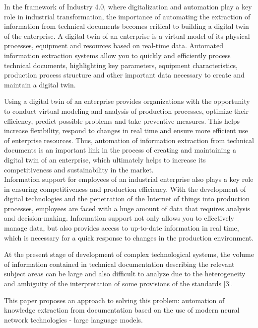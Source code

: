 \documentclass [11pt,a4paper]{article}
\begin{document}
\begin{multicols}{2}
\fontsize{11}{12}\selectfont \vspace{0.5cm} 
 \par   In the framework of Industry 4.0, where digitalization
and automation play a key role in industrial transformation, the importance of automating the extraction of
information from technical documents becomes critical
to building a digital twin of the enterprise. A digital twin
of an enterprise is a virtual model of its physical processes, equipment and resources based on real-time data.
Automated information extraction systems allow you
to quickly and efficiently process technical documents,
highlighting key parameters, equipment characteristics,
production process structure and other important data
necessary to create and maintain a digital twin.\setlength{\parskip}{0.1cm}
\par
Using a digital twin of an enterprise provides organizations with the opportunity to conduct virtual modeling
and analysis of production processes, optimize their
efficiency, predict possible problems and take preventive measures. This helps increase flexibility, respond
to changes in real time and ensure more efficient use
of enterprise resources. Thus, automation of information
extraction from technical documents is an important link
in the process of creating and maintaining a digital twin
of an enterprise, which ultimately helps to increase its
competitiveness and sustainability in the market.\\Information support for employees of an industrial
enterprise also plays a key role in ensuring competitiveness and production efficiency. With the development of
digital technologies and the penetration of the Internet
of things into production processes, employees are faced
with a huge amount of data that requires analysis and
decision-making. Information support not only allows
you to effectively manage data, but also provides access
to up-to-date information in real time, which is necessary for a quick response to changes in the production
environment.\par At the present stage of development of complex technological systems, the volume of information contained in
technical documentation describing the relevant subject
areas can be large and also difficult to analyze due to
the heterogeneity and ambiguity of the interpretation of
some provisions of the standards [3].
\setlength{\parskip}{0cm}
\fontsize{11}{12}\selectfont
\par This paper proposes an approach to solving this problem: automation of knowledge extraction from documentation based on the use of modern neural network
technologies - large language models.


\end{multicols}
\end{document}
